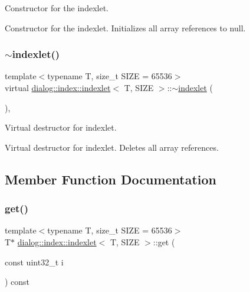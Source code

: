 Constructor for the indexlet. 

Constructor for the indexlet. Initializes all array references to null. \mbox{\label{classdialog_1_1index_1_1indexlet_afada63e2f9ead60d701688a06c2fcd81}} 
\subsubsection{\texorpdfstring{$\sim$indexlet()}{~indexlet()}}
{\footnotesize\ttfamily template$<$typename T, size\+\_\+t S\+I\+ZE = 65536$>$ \\
virtual \hyperlink{classdialog_1_1index_1_1indexlet}{dialog\+::index\+::indexlet}$<$ T, S\+I\+ZE $>$\+::$\sim$\hyperlink{classdialog_1_1index_1_1indexlet}{indexlet} (\begin{DoxyParamCaption}{ }\end{DoxyParamCaption})\hspace{0.3cm}{\ttfamily [inline]}, {\ttfamily [virtual]}}



Virtual destructor for indexlet. 

Virtual destructor for indexlet. Deletes all array references. 

\subsection{Member Function Documentation}
\mbox{\label{classdialog_1_1index_1_1indexlet_a06b8f0bb16c6ffc2ab1c13404d099298}} 
\subsubsection{\texorpdfstring{get()}{get()}}
{\footnotesize\ttfamily template$<$typename T, size\+\_\+t S\+I\+ZE = 65536$>$ \\
T$\ast$ \hyperlink{classdialog_1_1index_1_1indexlet}{dialog\+::index\+::indexlet}$<$ T, S\+I\+ZE $>$\+::get (\begin{DoxyParamCaption}\item[{const uint32\+\_\+t}]{i }\end{DoxyParamCaption}) const\hspace{0.3cm}{\ttfamily [inline]}}



